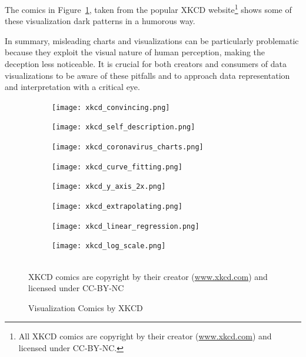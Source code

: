 The comics in Figure~\ref{fig:xkcd}, taken from the popular XKCD website\footnote{All XKCD comics are copyright by their creator (\url{www.xkcd.com}) and licensed under CC-BY-NC.} shows some of these visualization dark patterns in a humorous way. 

In summary, misleading charts and visualizations can be particularly problematic because they exploit the visual nature of human perception, making the deception less noticeable. It is crucial for both creators and consumers of data visualizations to be aware of these pitfalls and to approach data representation and interpretation with a critical eye.

\begin{figure}
\centering
\begin{subfigure}{.49\textwidth}
\centering
\texttt{[image: xkcd\_convincing.png]}
\end{subfigure}
\hfill
\begin{subfigure}{.49\textwidth}
\centering
  \texttt{[image: xkcd\_self\_description.png]} 
\end{subfigure}
\hfill
\begin{subfigure}{.49\textwidth}
\centering
  \texttt{[image: xkcd\_coronavirus\_charts.png]}
\end{subfigure}
\hfill
\begin{subfigure}{.49\textwidth}
\centering
  \texttt{[image: xkcd\_curve\_fitting.png]}
\end{subfigure}
\hfill
\begin{subfigure}{.49\textwidth}
\centering
  \texttt{[image: xkcd\_y\_axis\_2x.png]}
\end{subfigure}
\hfill
\begin{subfigure}{.49\textwidth}
\centering
  \texttt{[image: xkcd\_extrapolating.png]}
\end{subfigure}
\hfill
\begin{subfigure}{.49\textwidth}
\centering
  \texttt{[image: xkcd\_linear\_regression.png]}
\end{subfigure}
\hfill
\begin{subfigure}{.49\textwidth}
\centering
  \texttt{[image: xkcd\_log\_scale.png]}
\end{subfigure}
 \\ 
\tiny \scriptsize{XKCD comics are copyright by their creator (\url{www.xkcd.com}) and licensed under CC-BY-NC}

\caption{Visualization Comics by XKCD}
\label{fig:xkcd}
\end{figure}


